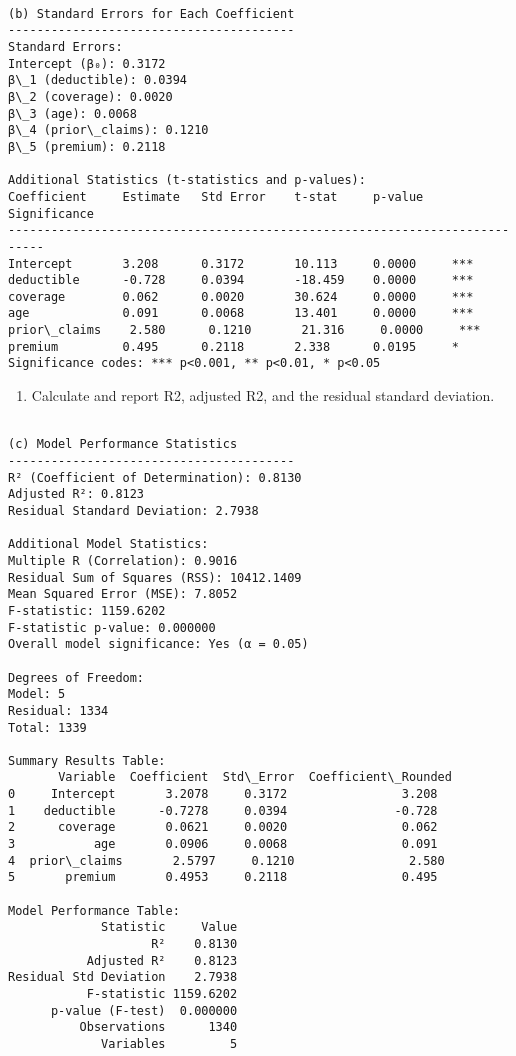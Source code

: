 \documentclass[8pt, twocolumn]{extarticle}
\providecommand{\tightlist}{%
      \setlength{\itemsep}{0pt}\setlength{\parskip}{0pt}}
\begin{document}
    \begin{Verbatim}[commandchars=\\\{\}]

(b) Standard Errors for Each Coefficient
----------------------------------------
Standard Errors:
Intercept (β₀): 0.3172
β\_1 (deductible): 0.0394
β\_2 (coverage): 0.0020
β\_3 (age): 0.0068
β\_4 (prior\_claims): 0.1210
β\_5 (premium): 0.2118

Additional Statistics (t-statistics and p-values):
Coefficient     Estimate   Std Error    t-stat     p-value    Significance
---------------------------------------------------------------------------
Intercept       3.208      0.3172       10.113     0.0000     ***
deductible      -0.728     0.0394       -18.459    0.0000     ***
coverage        0.062      0.0020       30.624     0.0000     ***
age             0.091      0.0068       13.401     0.0000     ***
prior\_claims    2.580      0.1210       21.316     0.0000     ***
premium         0.495      0.2118       2.338      0.0195     *
Significance codes: *** p<0.001, ** p<0.01, * p<0.05
    \end{Verbatim}

    \begin{enumerate}
\def\labelenumi{(\alph{enumi})}
\setcounter{enumi}{2}
\tightlist
\item
  Calculate and report R2, adjusted R2, and the residual standard
  deviation.
\end{enumerate}

    \begin{Verbatim}[commandchars=\\\{\}]

(c) Model Performance Statistics
----------------------------------------
R² (Coefficient of Determination): 0.8130
Adjusted R²: 0.8123
Residual Standard Deviation: 2.7938

Additional Model Statistics:
Multiple R (Correlation): 0.9016
Residual Sum of Squares (RSS): 10412.1409
Mean Squared Error (MSE): 7.8052
F-statistic: 1159.6202
F-statistic p-value: 0.000000
Overall model significance: Yes (α = 0.05)

Degrees of Freedom:
Model: 5
Residual: 1334
Total: 1339

Summary Results Table:
       Variable  Coefficient  Std\_Error  Coefficient\_Rounded
0     Intercept       3.2078     0.3172                3.208
1    deductible      -0.7278     0.0394               -0.728
2      coverage       0.0621     0.0020                0.062
3           age       0.0906     0.0068                0.091
4  prior\_claims       2.5797     0.1210                2.580
5       premium       0.4953     0.2118                0.495

Model Performance Table:
             Statistic     Value
                    R²    0.8130
           Adjusted R²    0.8123
Residual Std Deviation    2.7938
           F-statistic 1159.6202
      p-value (F-test)  0.000000
          Observations      1340
             Variables         5
    \end{Verbatim}
\end{document}
